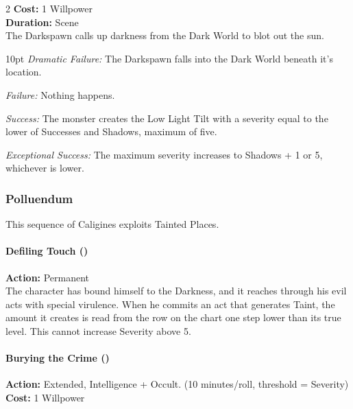 \begin{multicols}{2}
\noindent \textbf{Cost:} 1 Willpower\\

\noindent \textbf{Duration:} Scene \\

The Darkspawn calls up darkness from the Dark World to blot out the sun. 

\begin{myindentpar}{10pt} \emph{Dramatic Failure:} The Darkspawn falls into the Dark World beneath it's location. 

    \emph{Failure:} Nothing happens. 

    \emph{Success:} The monster creates the Low Light Tilt with a severity equal to the lower of Successes and Shadows, maximum of five. 

    \emph{Exceptional Success:} The maximum severity increases to Shadows + 1 or 5, whichever is lower.

    \end{myindentpar}
	
\subsubsection*{Polluendum}

This sequence of Caligines exploits Tainted Places.  \\

\paragraph*{Defiling Touch (\textbullet)}

\noindent \textbf{Action:} Permanent\\

\noindent The character has bound himself to the Darkness, and it reaches through his evil acts with special virulence. When he commits an act that generates Taint, the amount it creates is read from the row on the chart one step lower than its true level. This cannot increase Severity above 5. 

\paragraph*{Burying the Crime (\textbullet\textbullet)}

\noindent \textbf{Action:} Extended, Intelligence + Occult. (10 minutes/roll, threshold = Severity)\\

\noindent \textbf{Cost:} 1 Willpower\\


\end{multicols}
